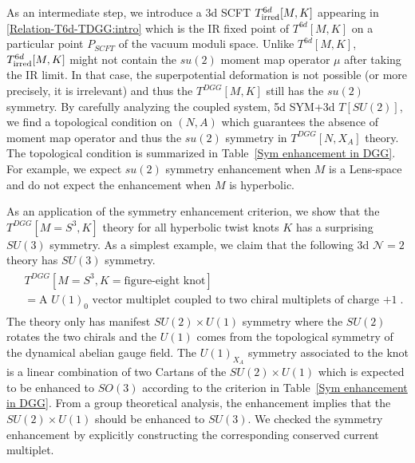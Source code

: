 \documentclass[a4paper,11pt]{article}
\begin{document}
As an intermediate step, we introduce a 3d SCFT $T^{6d}_{\rm irred}[M,K]$ appearing in \eqref{Relation-T6d-TDGG:intro}
which is the IR fixed point of $T^{6d}[M,K]$ on a particular point $P_{SCFT}$ of the vacuum moduli space.  
Unlike $T^{6d}[M,K]$, $T^{6d}_{\rm irred}[M,K]$ might not contain the $su(2)$ moment map operator $\mu$ after taking the IR limit.  In that case,   
the superpotential deformation is not possible (or more precisely, it is irrelevant) and  thus the $T^{DGG}[M,K]$ still has the $su(2)$ symmetry. By carefully analyzing the coupled system, 5d SYM+3d $T[SU(2)]$, we find a topological condition on $(N,A)$ which guarantees  the absence of moment map operator and thus the $su(2)$ symmetry in $T^{DGG}[N,X_A]$ theory.  The topological condition is summarized in Table~\ref{Sym enhancement in DGG}. For example, we expect $su(2)$ symmetry enhancement when $M$ is a Lens-space and do not expect the enhancement when $M$ is hyperbolic.   

As an application of the symmetry enhancement criterion, we show that the $T^{DGG}[M=S^3,K]$ theory for all hyperbolic twist knots $K$ has a surprising $SU(3)$ symmetry.  As a simplest example, we claim that  the following 3d $\mathcal{N}=2$ theory has $SU(3)$ symmetry. 
%
\begin{align}
\begin{split}
&T^{DGG}[M=S^3,K=\textrm{figure-eight knot}] 
\\
&= \textrm{A $U(1)_0$ vector multiplet coupled to two chiral multiplets of charge +1}\;.
\end{split}
\end{align}
%
The theory only has manifest $SU(2)\times U(1)$ symmetry where the $SU(2)$ rotates the two chirals and the $U(1)$ comes from the topological symmetry of the dynamical abelian gauge field. The $U(1)_{X_A}$ symmetry associated to the knot is a linear combination of two Cartans of the $SU(2)\times U(1)$ which is  expected to be enhanced to $SO(3)$ according to the criterion in Table~\ref{Sym enhancement in DGG}. From a group theoretical analysis, the enhancement   implies that the $SU(2)\times U(1)$ should be enhanced to $SU(3)$. We  checked the symmetry enhancement by explicitly constructing the corresponding conserved current multiplet. 
\end{document}
